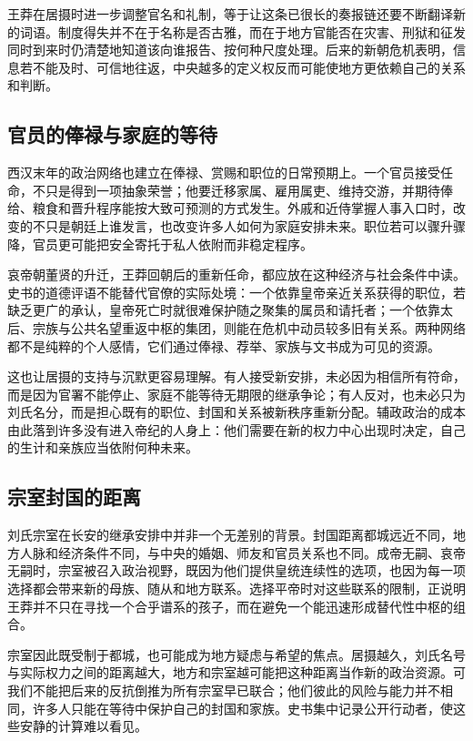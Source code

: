 王莽在居摄时进一步调整官名和礼制，等于让这条已很长的奏报链还要不断翻译新的词语。制度得失并不在于名称是否古雅，而在于地方官能否在灾害、刑狱和征发同时到来时仍清楚地知道该向谁报告、按何种尺度处理。后来的新朝危机表明，信息若不能及时、可信地往返，中央越多的定义权反而可能使地方更依赖自己的关系和判断。

\subsection{官员的俸禄与家庭的等待}

西汉末年的政治网络也建立在俸禄、赏赐和职位的日常预期上。一个官员接受任命，不只是得到一项抽象荣誉；他要迁移家属、雇用属吏、维持交游，并期待俸给、粮食和晋升程序能按大致可预测的方式发生。外戚和近侍掌握人事入口时，改变的不只是朝廷上谁发言，也改变许多人如何为家庭安排未来。职位若可以骤升骤降，官员更可能把安全寄托于私人依附而非稳定程序。

哀帝朝董贤的升迁，王莽回朝后的重新任命，都应放在这种经济与社会条件中读。史书的道德评语不能替代官僚的实际处境：一个依靠皇帝亲近关系获得的职位，若缺乏更广的承认，皇帝死亡时就很难保护随之聚集的属员和请托者；一个依靠太后、宗族与公共名望重返中枢的集团，则能在危机中动员较多旧有关系。两种网络都不是纯粹的个人感情，它们通过俸禄、荐举、家族与文书成为可见的资源。

这也让居摄的支持与沉默更容易理解。有人接受新安排，未必因为相信所有符命，而是因为官署不能停止、家庭不能等待无期限的继承争论；有人反对，也未必只为刘氏名分，而是担心既有的职位、封国和关系被新秩序重新分配。辅政政治的成本由此落到许多没有进入帝纪的人身上：他们需要在新的权力中心出现时决定，自己的生计和亲族应当依附何种未来。

\subsection{宗室封国的距离}

刘氏宗室在长安的继承安排中并非一个无差别的背景。封国距离都城远近不同，地方人脉和经济条件不同，与中央的婚姻、师友和官员关系也不同。成帝无嗣、哀帝无嗣时，宗室被召入政治视野，既因为他们提供皇统连续性的选项，也因为每一项选择都会带来新的母族、随从和地方联系。选择平帝时对这些联系的限制，正说明王莽并不只在寻找一个合乎谱系的孩子，而在避免一个能迅速形成替代性中枢的组合。

宗室因此既受制于都城，也可能成为地方疑虑与希望的焦点。居摄越久，刘氏名号与实际权力之间的距离越大，地方和宗室越可能把这种距离当作新的政治资源。可我们不能把后来的反抗倒推为所有宗室早已联合；他们彼此的风险与能力并不相同，许多人只能在等待中保护自己的封国和家族。史书集中记录公开行动者，使这些安静的计算难以看见。

